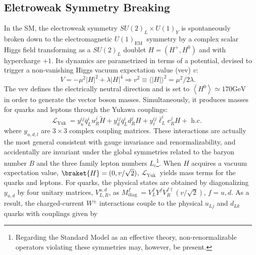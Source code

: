 \subsection{Eletroweak Symmetry Breaking}

In the SM, the electroweak symmetry $S U(2)_{L} \times U(1)_{Y}$ is spontaneously broken down to the electromagnetic $U(1)_{\text {EM }}$ symmetry by a complex scalar Higgs field transforming as a $S U(2)_{L}$ doublet $H=\left(H^{+}, H^{0}\right)$ and with hypercharge $+1$. Its dynamics are parametrized in terms of a potential, devised to trigger a non-vanishing Higgs vacuum expectation value (vev) $v$:
\begin{equation}
	V=-\mu^{2}|H|^{2}+\lambda|H|^{4} \Rightarrow v^{2} \equiv\langle|H|\rangle^{2}=\mu^{2} / 2 \lambda.
\end{equation}
The vev defines the electrically neutral direction and is set to $\left\langle H^{0}\right\rangle \simeq 170 \mathrm{GeV}$ in order to generate the vector boson masses. Simultaneously, it produces masses for quarks and leptons through the Yukawa couplings:
\begin{equation}
	\mathcal{L}_{\text {Yuk }}=y_{u}^{i j} \bar{q}_{L}^{i} u_{R}^{j} \tilde H+y_{d}^{i j} \bar{q}_{L}^{i} d_{R}^{j} H+y_{\ell}^{i j} \bar{\ell}_L^{i} e_{R}^{j} H+\text { h.c. }
\end{equation}
where $y_{u, d,l}$ are $3 \times 3$ complex coupling matrices.
These interactions are actually the most general consistent with gauge invariance and renormalizability, and accidentally are invariant under the global symmetries related to the baryon number $B$ and the three family lepton numbers $L_{i}$\footnote{Regarding the Standard Model as an effective theory, non-renormalizable operators violating these symmetries may, however, be present.}. When $H$ acquires a vacuum expectation value, $\braket{H}=(0, v / \sqrt{2})$, $\mathcal{L}_{\text {Yuk }}$ yields mass terms for the quarks and leptons. For quarks, the physical states are obtained by diagonalizing $y_{u, d}$ by four unitary matrices, $V_{L, R}^{u, d}$, as $M_{\text {diag }}^{f}=V_{L}^{f} Y^{f} V_{R}^{f \dagger}(v / \sqrt{2})$, $f=u, d$. As a result, the charged-current $W^{\pm}$ interactions couple to the physical $u_{L j}$ and $d_{L k}$ quarks with couplings given by

